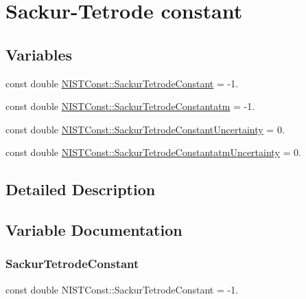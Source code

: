 \hypertarget{group___sackur_tetrode_constant}{}\section{Sackur-\/\+Tetrode constant}
\label{group___sackur_tetrode_constant}
\subsection*{Variables}
\begin{DoxyCompactItemize}
\item 
const double \hyperlink{group___sackur_tetrode_constant_gabd9928304da228b5f9c482aa488ea6bd}{N\+I\+S\+T\+Const\+::\+Sackur\+Tetrode\+Constant} = -\/1.
\item 
const double \hyperlink{group___sackur_tetrode_constant_ga476418a3565db707ed30de46c3126220}{N\+I\+S\+T\+Const\+::\+Sackur\+Tetrode\+Constantatm} = -\/1.
\item 
const double \hyperlink{group___sackur_tetrode_constant_gaddb81f9301bb4f3f7b4e760df5f6e65a}{N\+I\+S\+T\+Const\+::\+Sackur\+Tetrode\+Constant\+Uncertainty} = 0.
\item 
const double \hyperlink{group___sackur_tetrode_constant_ga8c5fe541a49c469d78c8d291ceb644c4}{N\+I\+S\+T\+Const\+::\+Sackur\+Tetrode\+Constantatm\+Uncertainty} = 0.
\end{DoxyCompactItemize}


\subsection{Detailed Description}


\subsection{Variable Documentation}
\mbox{\label{group___sackur_tetrode_constant_gabd9928304da228b5f9c482aa488ea6bd}} 
\subsubsection{\texorpdfstring{Sackur\+Tetrode\+Constant}{SackurTetrodeConstant}}
{\footnotesize\ttfamily const double N\+I\+S\+T\+Const\+::\+Sackur\+Tetrode\+Constant = -\/1.}

